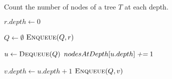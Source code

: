 
\begin{algorithm}[t]
  \caption{Count the number of nodes of a tree $T$ at each depth.}
  \label{alg:nodes-at-depth}
  \begin{algorithmic}[1]
     
      \State $r.depth \gets 0$

      \hStatex
      \State $Q \gets \emptyset$
      \State $\Call{Enqueue}{Q, r}$

      \hStatex
	\State $u \gets \Call{Dequeue}{Q}$
	\State $nodesAtDepth[u.depth] \textsl{\;+=\;} 1$

	\hStatex
	  \State $v.depth \gets u.depth + 1$
	  \State $\Call{Enqueue}{Q, v}$
	\EndFor
      \EndWhile
    \EndProcedure
  \end{algorithmic}
\end{algorithm}
